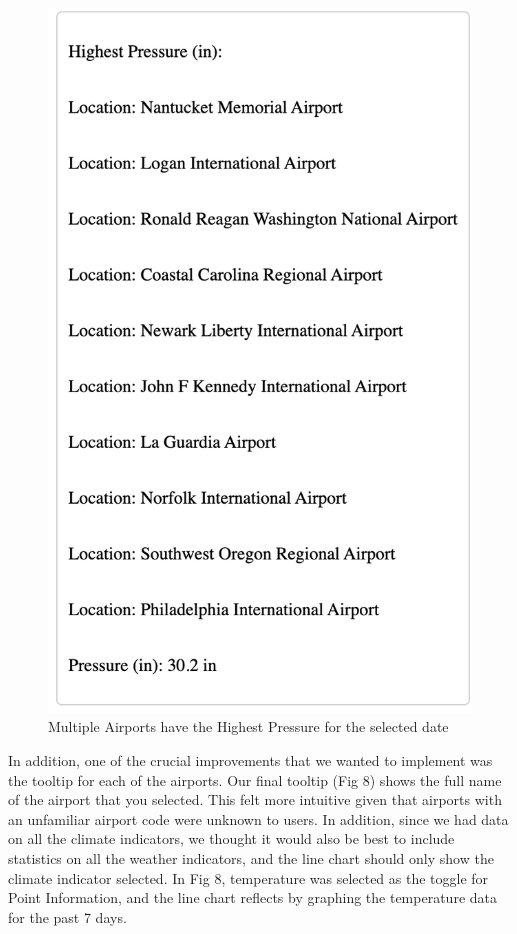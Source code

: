 \documentclass[10pt,twocolumn,twoside]{opticajnl}
\begin{document}
\begin{figure}
    \includegraphics[scale=0.5]{images/img8.png}
    \caption{Multiple Airports have the Highest Pressure for the selected date}
\end{figure}

In addition, one of the crucial improvements that we wanted to implement was the tooltip for each of the airports. Our final tooltip (Fig 8) shows the full name of the airport that you selected. This felt more intuitive given that airports with an unfamiliar airport code were unknown to users. In addition, since we had data on all the climate indicators, we thought it would also be best to include statistics on all the weather indicators, and the line chart should only show the climate indicator selected. In Fig 8, temperature was selected as the toggle for Point Information, and the line chart reflects by graphing the temperature data for the past 7 days.
\end{document}
